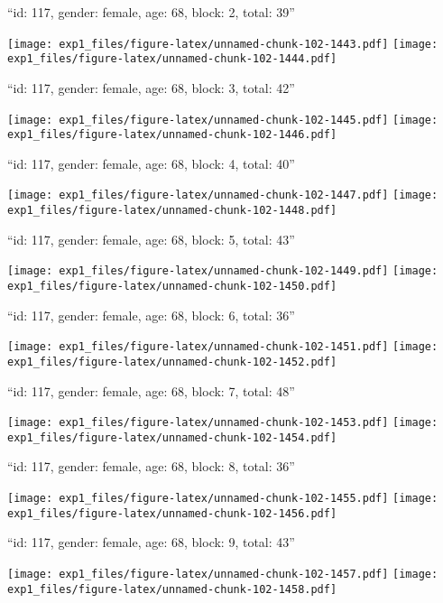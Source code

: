 \documentclass[11pt,,]{article}
\begin{document}
\newpage
[1] 

``id: 117, gender: female, age: 68, block: 2, total: 39''

\texttt{[image: exp1\_files/figure-latex/unnamed-chunk-102-1443.pdf]}
\texttt{[image: exp1\_files/figure-latex/unnamed-chunk-102-1444.pdf]}

\newpage
[1] 

``id: 117, gender: female, age: 68, block: 3, total: 42''

\texttt{[image: exp1\_files/figure-latex/unnamed-chunk-102-1445.pdf]}
\texttt{[image: exp1\_files/figure-latex/unnamed-chunk-102-1446.pdf]}

\newpage
[1] 

``id: 117, gender: female, age: 68, block: 4, total: 40''

\texttt{[image: exp1\_files/figure-latex/unnamed-chunk-102-1447.pdf]}
\texttt{[image: exp1\_files/figure-latex/unnamed-chunk-102-1448.pdf]}

\newpage
[1] 

``id: 117, gender: female, age: 68, block: 5, total: 43''

\texttt{[image: exp1\_files/figure-latex/unnamed-chunk-102-1449.pdf]}
\texttt{[image: exp1\_files/figure-latex/unnamed-chunk-102-1450.pdf]}

\newpage
[1] 

``id: 117, gender: female, age: 68, block: 6, total: 36''

\texttt{[image: exp1\_files/figure-latex/unnamed-chunk-102-1451.pdf]}
\texttt{[image: exp1\_files/figure-latex/unnamed-chunk-102-1452.pdf]}

\newpage
[1] 

``id: 117, gender: female, age: 68, block: 7, total: 48''

\texttt{[image: exp1\_files/figure-latex/unnamed-chunk-102-1453.pdf]}
\texttt{[image: exp1\_files/figure-latex/unnamed-chunk-102-1454.pdf]}

\newpage
[1] 

``id: 117, gender: female, age: 68, block: 8, total: 36''

\texttt{[image: exp1\_files/figure-latex/unnamed-chunk-102-1455.pdf]}
\texttt{[image: exp1\_files/figure-latex/unnamed-chunk-102-1456.pdf]}

\newpage
[1] 

``id: 117, gender: female, age: 68, block: 9, total: 43''

\texttt{[image: exp1\_files/figure-latex/unnamed-chunk-102-1457.pdf]}
\texttt{[image: exp1\_files/figure-latex/unnamed-chunk-102-1458.pdf]}
\end{document}

